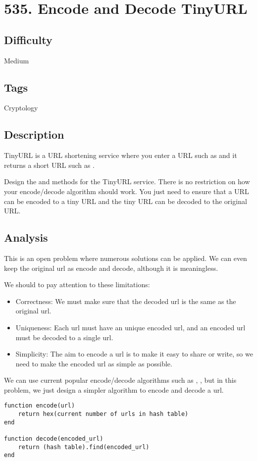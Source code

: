 \section*{535. Encode and Decode TinyURL}
\label{algo:535}

\subsection*{Difficulty}
Medium

\subsection*{Tags}
Cryptology

\subsection*{Description}
TinyURL is a URL shortening service where you enter a URL such as  and it returns a short URL such as .

Design the  and  methods for the TinyURL service. There is no restriction on how your encode/decode algorithm should work. You just need to ensure that a URL can be encoded to a tiny URL and the tiny URL can be decoded to the original URL.

\subsection*{Analysis}
This is an open problem where numerous solutions can be applied. We can even keep the original url as encode and decode, although it is meaningless.

We should to pay attention to these limitations:
\begin{itemize}
	\item Correctness: We must make sure that the decoded url is the same as the original url.
	\item Uniqueness: Each url must have an unique encoded url, and an encoded url must be decoded to a single url.
	\item Simplicity: The aim to encode a url is to make it easy to share or write, so we need to make the encoded url as simple as possible.
\end{itemize}

We can use current popular encode/decode algorithms such as , , but in this problem, we just design a simpler algorithm to encode and decode a url.
\begin{verbatim}
function encode(url)
    return hex(current number of urls in hash table)
end

function decode(encoded_url)
    return (hash table).find(encoded_url)
end
\end{verbatim}

